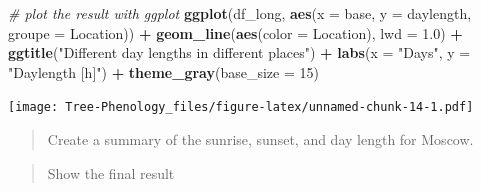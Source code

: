 \documentclass[
]{book}
\newenvironment{Shaded}{\begin{snugshade}}{\end{snugshade}}
\newcommand{\CommentTok}[1]{\textcolor[rgb]{0.56,0.35,0.01}{\textit{#1}}}
\newcommand{\DataTypeTok}[1]{\textcolor[rgb]{0.13,0.29,0.53}{#1}}
\newcommand{\DecValTok}[1]{\textcolor[rgb]{0.00,0.00,0.81}{#1}}
\newcommand{\FloatTok}[1]{\textcolor[rgb]{0.00,0.00,0.81}{#1}}
\newcommand{\KeywordTok}[1]{\textcolor[rgb]{0.13,0.29,0.53}{\textbf{#1}}}
\newcommand{\NormalTok}[1]{#1}
\newcommand{\OperatorTok}[1]{\textcolor[rgb]{0.81,0.36,0.00}{\textbf{#1}}}
\newcommand{\StringTok}[1]{\textcolor[rgb]{0.31,0.60,0.02}{#1}}
\begin{document}
\begin{Shaded}
\begin{Highlighting}[]
\CommentTok{# plot the result with ggplot}
\KeywordTok{ggplot}\NormalTok{(df_long, }\KeywordTok{aes}\NormalTok{(}\DataTypeTok{x =}\NormalTok{ base, }\DataTypeTok{y =}\NormalTok{ daylength, }\DataTypeTok{groupe =}\NormalTok{ Location)) }\OperatorTok{+}
\StringTok{  }\KeywordTok{geom_line}\NormalTok{(}\KeywordTok{aes}\NormalTok{(}\DataTypeTok{color =}\NormalTok{ Location), }\DataTypeTok{lwd =} \FloatTok{1.0}\NormalTok{) }\OperatorTok{+}
\StringTok{  }\KeywordTok{ggtitle}\NormalTok{(}\StringTok{"Different day lengths in different places"}\NormalTok{) }\OperatorTok{+}
\StringTok{  }\KeywordTok{labs}\NormalTok{(}\DataTypeTok{x =} \StringTok{"Days"}\NormalTok{, }\DataTypeTok{y =} \StringTok{"Daylength [h]"}\NormalTok{) }\OperatorTok{+}\StringTok{ }\KeywordTok{theme_gray}\NormalTok{(}\DataTypeTok{base_size =} \DecValTok{15}\NormalTok{)}
\end{Highlighting}
\end{Shaded}

\texttt{[image: Tree-Phenology\_files/figure-latex/unnamed-chunk-14-1.pdf]}

\begin{quote}
Create a summary of the sunrise, sunset, and day length for Moscow.
\end{quote}

\begin{Shaded}
\end{Shaded}

\begin{quote}
Show the final result
\end{quote}
\end{document}
